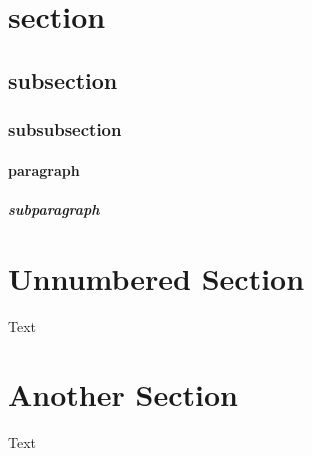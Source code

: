 \documentclass[12pt, a4paper]{article} %
\begin{document}
    \section{section}
        \subsection{subsection}
            \subsubsection{subsubsection}
                \paragraph{paragraph}
                    \subparagraph{subparagraph}

    \section*{Unnumbered Section}
        Text

    \section{Another Section}
        Text

    
    
\end{document}
